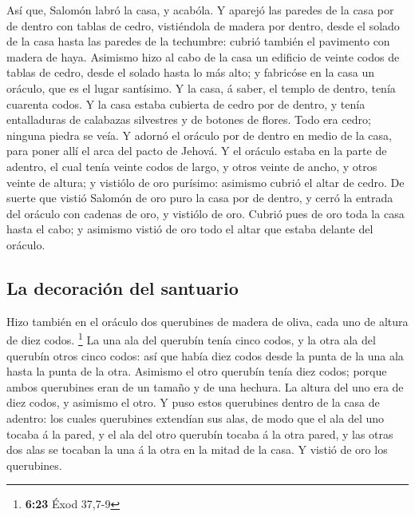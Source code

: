  Así que, Salomón labró la casa, y acabóla.
 Y aparejó las paredes de la casa por de dentro con
tablas de cedro, vistiéndola de madera por dentro, desde el solado de la
casa hasta las paredes de la techumbre: cubrió también el pavimento con
madera de haya.  Asimismo hizo al cabo de la casa un
edificio de veinte codos de tablas de cedro, desde el solado hasta lo
más alto; y fabricóse en la casa un oráculo, que es el lugar santísimo.
 Y la casa, á saber, el templo de dentro, tenía cuarenta
codos.  Y la casa estaba cubierta de cedro por de dentro,
y tenía entalladuras de calabazas silvestres y de botones de flores.
Todo era cedro; ninguna piedra se veía.  Y adornó el
oráculo por de dentro en medio de la casa, para poner allí el arca del
pacto de Jehová.  Y el oráculo estaba en la parte de
adentro, el cual tenía veinte codos de largo, y otros veinte de ancho, y
otros veinte de altura; y vistiólo de oro purísimo: asimismo cubrió el
altar de cedro.  De suerte que vistió Salomón de oro puro
la casa por de dentro, y cerró la entrada del oráculo con cadenas de
oro, y vistiólo de oro.  Cubrió pues de oro toda la casa
hasta el cabo; y asimismo vistió de oro todo el altar que estaba delante
del oráculo.

\hypertarget{la-decoraciuxf3n-del-santuario}{%
\subsection{La decoración del
santuario}\label{la-decoraciuxf3n-del-santuario}}

 Hizo también en el oráculo dos querubines de madera de
oliva, cada uno de altura de diez codos. \footnote{\textbf{6:23} Éxod
  37,7-9}  La una ala del querubín tenía cinco codos, y
la otra ala del querubín otros cinco codos: así que había diez codos
desde la punta de la una ala hasta la punta de la otra. 
Asimismo el otro querubín tenía diez codos; porque ambos querubines eran
de un tamaño y de una hechura.  La altura del uno era de
diez codos, y asimismo el otro.  Y puso estos querubines
dentro de la casa de adentro: los cuales querubines extendían sus alas,
de modo que el ala del uno tocaba á la pared, y el ala del otro querubín
tocaba á la otra pared, y las otras dos alas se tocaban la una á la otra
en la mitad de la casa.  Y vistió de oro los querubines.

